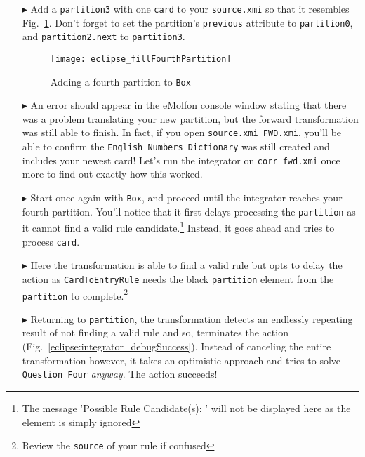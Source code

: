 \begin{itemize}

\item[$\blacktriangleright$] Add a \texttt{partition3} with one \texttt{card} to your \texttt{source.xmi} so that it resembles
Fig.~\ref{eclipse:fourthPartitionStart}. Don't forget to set the partition's \texttt{previous} attribute to \texttt{partition0}, and \texttt{partition2.next} to
\texttt{partition3}.

\begin{figure}[htbp]
\begin{center}
  \texttt{[image: eclipse\_fillFourthPartition]}
  \caption{Adding a fourth partition to \texttt{Box}}
  \label{eclipse:fourthPartitionStart}
\end{center}
\end{figure}

\item[$\blacktriangleright$] An error should appear in the eMolfon console window stating that there was a problem translating your new partition, but the
forward transformation was still able to finish. In fact, if you open \texttt{source.xmi\_FWD.xmi}, you'll be able to confirm the \texttt{English Numbers
Dictionary} was still created and includes your newest card! Let's run the integrator on \texttt{corr\_fwd.xmi} once more to find out exactly how this worked.

\item[$\blacktriangleright$] Start once again with \texttt{Box}, and proceed until the integrator reaches your fourth partition. You'll notice that it
first delays processing the \texttt{partition} as it cannot find a valid rule candidate.\footnote{The message 'Possible Rule Candidate(s): ' will not be
displayed here as the element is simply ignored} Instead, it goes ahead and tries to process \texttt{card}.

\item[$\blacktriangleright$] Here the transformation is able to find a valid rule but opts to delay the action as \texttt{CardToEntryRule} needs the black
\texttt{partition} element from the \texttt{partition} to complete.\footnote{Review the \texttt{source} of your rule if confused}

\item[$\blacktriangleright$] Returning to \texttt{partition}, the transformation detects an endlessly repeating result of not finding a valid rule and so,
terminates the action (Fig.~\ref{eclipse:integrator_debugSuccess}). Instead of canceling the entire transformation however, it takes an optimistic approach and
tries to solve \texttt{Question Four} \emph{anyway}. The action succeeds!


\end{itemize}
